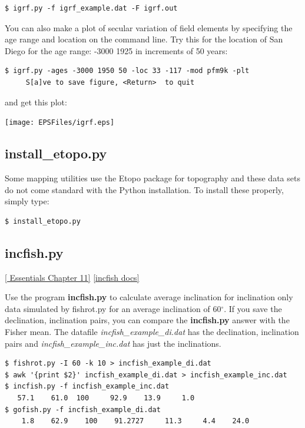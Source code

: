 \documentclass[11pt]{book}
\begin{document}
{{{{\begin{verbatim}
$ igrf.py -f igrf_example.dat -F igrf.out
\end{verbatim}

You can also make a plot of secular variation of field elements by specifying the age range and location on the command line.  Try this for the location of San Diego for the age range: -3000 1925 in increments of 50 years:

\begin{verbatim}
$ igrf.py -ages -3000 1950 50 -loc 33 -117 -mod pfm9k -plt
     S[a]ve to save figure, <Return>  to quit
\end{verbatim}

and get this plot:


  \texttt{[image: EPSFiles/igrf.eps]}


\subsection{install\_etopo.py}

Some  mapping utilities use the Etopo package for topography and these data sets do not come standard with the Python installation.  To install these properly, simply type:

\begin{verbatim}
$ install_etopo.py
\end{verbatim}







\subsection{incfish.py}
\href{http://earthref.org/MAGIC/books/Tauxe/Essentials/WebBook3ch11.html#ch11}{ [ Essentials Chapter 11]}
\href{https://github.com/PmagPy/PmagPy/blob/master/programs/incfish.py}{[incfish docs]}

Use the program {\bf incfish.py} to calculate average inclination for inclination only data
simulated by fishrot.py for an average inclination of 60$^{\circ}$.   If you save the declination, inclination
pairs, you can compare the {\bf incfish.py} answer with the Fisher mean.    The datafile {\it incfish\_example\_di.dat} has the declination, inclination pairs and {\it incfish\_example\_inc.dat} has just the inclinations.

\begin{verbatim}
$ fishrot.py -I 60 -k 10 > incfish_example_di.dat
$ awk '{print $2}' incfish_example_di.dat > incfish_example_inc.dat
$ incfish.py -f incfish_example_inc.dat
   57.1    61.0  100     92.9    13.9     1.0
$ gofish.py -f incfish_example_di.dat
    1.8    62.9    100    91.2727     11.3     4.4    24.0
\end{verbatim}

}}}}
\end{document}
